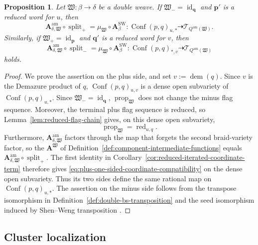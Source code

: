 \documentclass[10pt,a4paper]{article}
\newtheorem{proposition}[theorem]{Proposition}
\theoremstyle{definition}
\theoremstyle{remark}
\newcommand{\Conf}{\operatorname{Conf}}
\newcommand{\Tcal}{\mathcal T}
\newcommand{\fW}{\mathfrak W}
\newcommand{\Split}{\operatorname{split}}
\newcommand{\id}{\operatorname{id}}
\begin{document}
\begin{proposition}
\label{prop:one-sided-coordinate-compatibility}
Let \(\fW:\beta\to\delta\) be a double weave.  If
\(\fW_-=\id_{\mathbf q}\) and \(\mathbf p'\) is a reduced word for \(u\),
then
\begin{equation}
 \mathbf A_{\delta,\fW}^{\mathrm{am}}\circ\Split_+
 =\mu_\fW\circ\mathbf A_\beta^{\mathrm{SW}}:
 \Conf(p,q)_{u,*}
 \dashrightarrow\Tcal_{Q^{\mathrm{am}}(\fW)}.
 \label{eq:plus-one-sided-coordinate-compatibility}
\end{equation}
Similarly, if \(\fW_+=\id_{\mathbf p}\) and \(\mathbf q'\) is a reduced word
for \(v\), then
\begin{equation}
 \mathbf A_{\delta,\fW}^{\mathrm{am}}\circ\Split_-
 =\mu_\fW\circ\mathbf A_\beta^{\mathrm{SW}}:
 \Conf(p,q)_{*,v}
 \dashrightarrow\Tcal_{Q^{\mathrm{am}}(\fW)}
 \label{eq:minus-one-sided-coordinate-compatibility}
\end{equation}
holds.
\end{proposition}

\begin{proof}
We prove the assertion on the plus side, and set
\(v:=\operatorname{dem}(q)\).  Since \(v\) is the Demazure product of \(q\),
\(\Conf(p,q)_{u,v}\) is a dense open subvariety of
\(\Conf(p,q)_{u,*}\).  Since \(\fW_-=\id_{\mathbf q}\),
\(\operatorname{prop}_{\fW}\) does not change the minus flag sequence.
Moreover, the terminal plus flag sequence is reduced, so
Lemma~\ref{lem:reduced-flag-chain} gives, on this dense open subvariety,
\[
 \operatorname{prop}_{\fW}=\operatorname{red}_{u,q}.
\]
Furthermore, \(\mathbf A_{\delta,\fW}^{\mathrm{am}}\) factors through the map
that forgets the second braid-variety factor, so the \(\mathbf A^\fW\) of
Definition~\ref{def:component-intermediate-functions} equals
\(\mathbf A_{\delta,\fW}^{\mathrm{am}}\circ\Split_+\).  The first identity in
Corollary~\ref{cor:reduced-iterated-coordinate-term} therefore gives
\eqref{eq:plus-one-sided-coordinate-compatibility} on the dense open
subvariety.  Thus its two sides define the same rational map on
\(\Conf(p,q)_{u,*}\).  The assertion on the minus side follows from the
transpose isomorphism in Definition~\ref{def:double-bs-transposition} and the
seed isomorphism induced by Shen--Weng transposition
\cite[Proposition~3.9]{ShenWeng2021}.
\end{proof}

\subsection{Cluster localization}
\label{subsec:endpoint-locus-cluster-variables}
\end{document}
